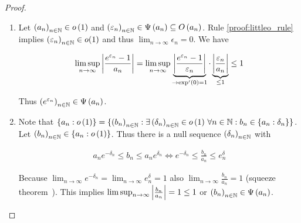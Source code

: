 \begin{proof}
\begin{enumerate}
    \item

      Let $\seq{a_n}\in\littleo{1}$ and $\seq{\epsilon_n}\in\bigpsi{a_n}\subseteq \bigo{a_n}$. Rule \ref{proof:littleo_rule} implies $\seq{\epsilon_n} \in o(1)$ and thus $\lim_{n\to\infty} \epsilon_n = 0$. We have

      \begin{align}
        \limsup_{n\to\infty} \abs{\frac{e^{\epsilon_n}-1}{a_n}} = \limsup_{n\to\infty} \underbrace{\abs{\frac{e^{\epsilon_n}-1}{\epsilon_n}}}_{\to \exp'(0)=1} \cdot \underbrace{\abs{\frac{\epsilon_n}{a_n}}}_{\le 1} \le 1
      \end{align}

      \noindent Thus $\seq{e^{\epsilon_n}} \in \bigpsi{a_n}$.

    \item

      Note that $\ean[\littleo{1}]{a_n} = \{ \seq{b_n} : \exists \seq{\delta_n} \in \littleo{1} \,\forall n\in\N: b_n \in \ean[\delta_n]{a_n}\}$. Let $\seq{b_n} \in \ean[\littleo{1}]{a_n}$. Thus there is a null sequence $\seq{\delta_n}$ with
      
      \begin{align}
        a_ne^{-\delta_n} \le b_n \le a_ne^{\delta_n} \iff e^{-\delta_n} \le \frac{b_n}{a_n} \le e^\delta_n
      \end{align}

      Because $\lim_{n\to\infty} e^{-\delta_n} = \lim_{n\to\infty} e^\delta_n = 1$ also $\lim_{n\to\infty} \frac{b_n}{a_n} = 1$ (squeeze theorem~\cite{wiki:squeeze}). This implies $\limsup_{n\to\infty} \abs{\frac{b_n}{a_n}} = 1 \le 1$ or $\seq{b_n} \in \bigpsi{a_n}$.
  \end{enumerate}
\end{proof}
